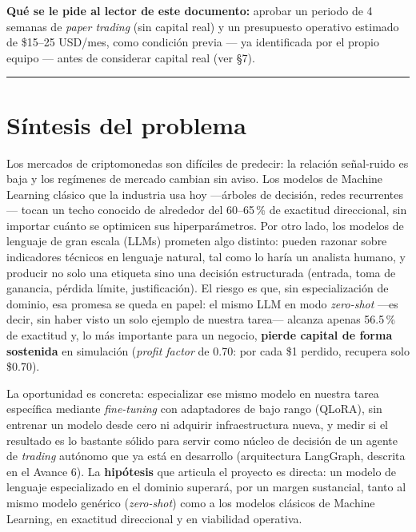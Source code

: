 \documentclass[11pt]{article}
\begin{document}
\vspace{1em}
\noindent\textbf{Qu\'e se le pide al lector de este documento:} aprobar un periodo de 4 semanas de \textit{paper trading} (sin capital real) y un presupuesto operativo estimado de \$15--25 USD/mes, como condici\'on previa --- ya identificada por el propio equipo --- antes de considerar capital real (ver \S7).

\vspace{0.6em}
\hrule
\vspace{1.2em}

\section{S\'intesis del problema}

Los mercados de criptomonedas son dif\'iciles de predecir: la relaci\'on se\~nal-ruido es baja y los reg\'imenes de mercado cambian sin aviso. Los modelos de Machine Learning cl\'asico que la industria usa hoy ---\'arboles de decisi\'on, redes recurrentes--- tocan un techo conocido de alrededor del 60--65\,\% de exactitud direccional, sin importar cu\'anto se optimicen sus hiperpar\'ametros. Por otro lado, los modelos de lenguaje de gran escala (LLMs) prometen algo distinto: pueden razonar sobre indicadores t\'ecnicos en lenguaje natural, tal como lo har\'ia un analista humano, y producir no solo una etiqueta sino una decisi\'on estructurada (entrada, toma de ganancia, p\'erdida l\'imite, justificaci\'on). El riesgo es que, sin especializaci\'on de dominio, esa promesa se queda en papel: el mismo LLM en modo \textit{zero-shot} ---es decir, sin haber visto un solo ejemplo de nuestra tarea--- alcanza apenas 56.5\,\% de exactitud y, lo m\'as importante para un negocio, \textbf{pierde capital de forma sostenida} en simulaci\'on (\textit{profit factor} de 0.70: por cada \$1 perdido, recupera solo \$0.70).

La oportunidad es concreta: especializar ese mismo modelo en nuestra tarea espec\'ifica mediante \textit{fine-tuning} con adaptadores de bajo rango (QLoRA), sin entrenar un modelo desde cero ni adquirir infraestructura nueva, y medir si el resultado es lo bastante s\'olido para servir como n\'ucleo de decisi\'on de un agente de \textit{trading} aut\'onomo que ya est\'a en desarrollo (arquitectura LangGraph, descrita en el Avance 6). La \textbf{hip\'otesis} que articula el proyecto es directa: un modelo de lenguaje especializado en el dominio superar\'a, por un margen sustancial, tanto al mismo modelo gen\'erico (\textit{zero-shot}) como a los modelos cl\'asicos de Machine Learning, en exactitud direccional y en viabilidad operativa.
\end{document}

